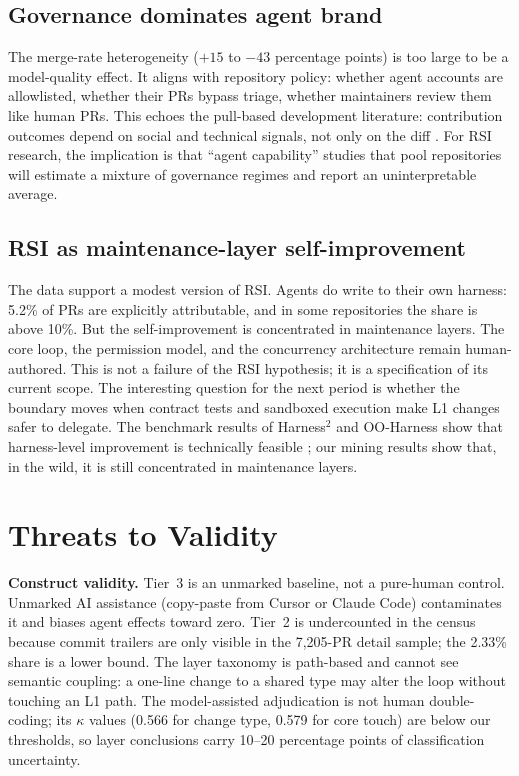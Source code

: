 \documentclass[sigconf,review]{acmart}
\begin{document}
\subsection{Governance dominates agent brand}

The merge-rate heterogeneity ($+15$ to $-43$ percentage points) is too large to be a model-quality effect. It aligns with repository policy: whether agent accounts are allowlisted, whether their PRs bypass triage, whether maintainers review them like human PRs. This echoes the pull-based development literature: contribution outcomes depend on social and technical signals, not only on the diff \citep{tsay2014,gousios2014}. For RSI research, the implication is that ``agent capability'' studies that pool repositories will estimate a mixture of governance regimes and report an uninterpretable average.

\subsection{RSI as maintenance-layer self-improvement}

The data support a modest version of RSI. Agents do write to their own harness: 5.2\% of PRs are explicitly attributable, and in some repositories the share is above 10\%. But the self-improvement is concentrated in maintenance layers. The core loop, the permission model, and the concurrency architecture remain human-authored. This is not a failure of the RSI hypothesis; it is a specification of its current scope. The interesting question for the next period is whether the boundary moves when contract tests and sandboxed execution make L1 changes safer to delegate. The benchmark results of Harness$^2$ and OO-Harness show that harness-level improvement is technically feasible \citep{xu2026harness2,li2026ooharness}; our mining results show that, in the wild, it is still concentrated in maintenance layers.

\section{Threats to Validity}
\label{sec:threats}

\textbf{Construct validity.} Tier~3 is an unmarked baseline, not a pure-human control. Unmarked AI assistance (copy-paste from Cursor or Claude Code) contaminates it and biases agent effects toward zero. Tier~2 is undercounted in the census because commit trailers are only visible in the 7,205-PR detail sample; the 2.33\% share is a lower bound. The layer taxonomy is path-based and cannot see semantic coupling: a one-line change to a shared type may alter the loop without touching an L1 path. The model-assisted adjudication is not human double-coding; its $\kappa$ values (0.566 for change type, 0.579 for core touch) are below our thresholds, so layer conclusions carry 10--20 percentage points of classification uncertainty.
\end{document}
